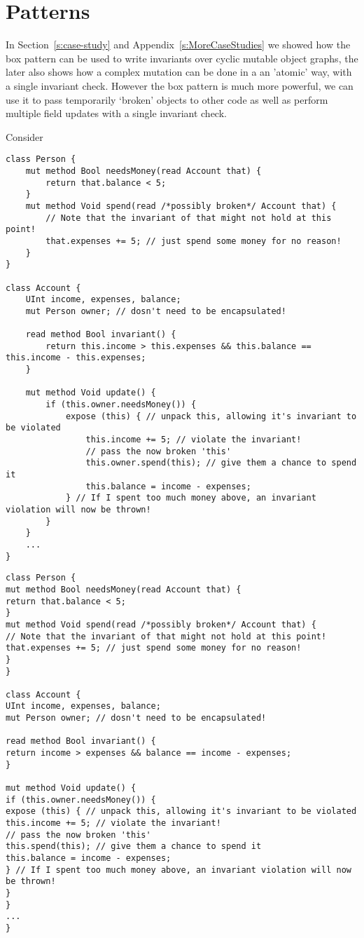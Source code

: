 \section{Patterns}
\label{s:patterns}

In Section~\ref{s:case-study} and Appendix~\ref{s:MoreCaseStudies} we showed how the box pattern can be used to write invariants over cyclic mutable object graphs, the later also shows how a complex mutation can be done in a an 'atomic' way, with a single invariant check. However the box pattern is much more powerful, we can use it to pass temporarily `broken' objects to other code as well as perform multiple field updates with a single invariant check.

Consider
\begin{lstlisting}
class Person {
	mut method Bool needsMoney(read Account that) { 
		return that.balance < 5;
	}
	mut method Void spend(read /*possibly broken*/ Account that) { 
		// Note that the invariant of that might not hold at this point!
		that.expenses += 5; // just spend some money for no reason!
	}
}

class Account {
	UInt income, expenses, balance;
	mut Person owner; // dosn't need to be encapsulated!

	read method Bool invariant() {
		return this.income > this.expenses && this.balance == this.income - this.expenses;
	}
	
	mut method Void update() {
		if (this.owner.needsMoney()) {
			expose (this) { // unpack this, allowing it's invariant to be violated
				this.income += 5; // violate the invariant!
				// pass the now broken 'this'
				this.owner.spend(this); // give them a chance to spend it
				this.balance = income - expenses;
			} // If I spent too much money above, an invariant violation will now be thrown!
		}
	}
	...
}
\end{lstlisting}


\begin{lstlisting}
class Person {
mut method Bool needsMoney(read Account that) { 
return that.balance < 5;
}
mut method Void spend(read /*possibly broken*/ Account that) { 
// Note that the invariant of that might not hold at this point!
that.expenses += 5; // just spend some money for no reason!
}
}

class Account {
UInt income, expenses, balance;
mut Person owner; // dosn't need to be encapsulated!

read method Bool invariant() {
return income > expenses && balance == income - expenses;
}

mut method Void update() {
if (this.owner.needsMoney()) {
expose (this) { // unpack this, allowing it's invariant to be violated
this.income += 5; // violate the invariant!
// pass the now broken 'this'
this.spend(this); // give them a chance to spend it
this.balance = income - expenses;
} // If I spent too much money above, an invariant violation will now be thrown!
}
}
...
}
\end{lstlisting}

